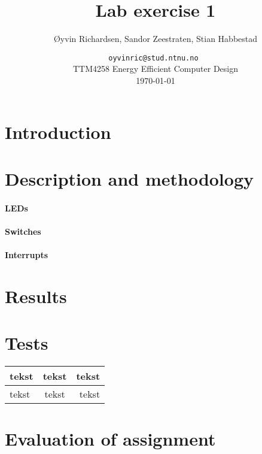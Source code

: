 \documentclass[a4paper,11pt]{article}
\title{Lab exercise 1}
\author{\O yvin Richardsen, Sandor Zeestraten, Stian Habbestad}
\date{ {\tt oyvinric@stud.ntnu.no }\\
TTM4258 Energy Efficient Computer Design \\
\today}
\begin{document}
\maketitle
\newpage

\begin{abstract}

\end{abstract}

\tableofcontents



\section{Introduction}


\section{Description and methodology}
\paragraph{LEDs}

\paragraph{Switches}

\paragraph{Interrupts}

\section{Results}

\section{Tests}
\begin{tabular}[pos]{| l | c | r |}
\hline
tekst & tekst & tekst \\ \hline
tekst & tekst & tekst \\ \hline
\end{tabular}


\section{Evaluation of assignment}
\end{document}
